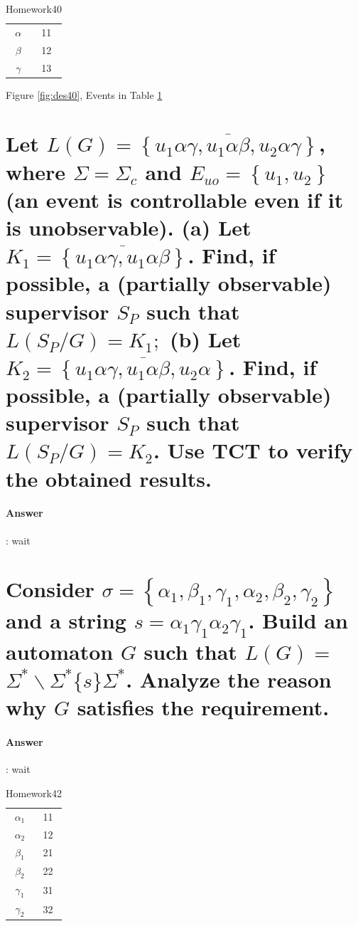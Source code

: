 \documentclass{article}
\begin{document}
\begin{table}
  \centering
  \begin{tabular}{|c|c|}
    $\alpha$ & 11\\
    $\beta$ & 12\\
    $\gamma$ & 13\\
  \end{tabular}
  \caption{Homework40}
  \label{tab:des40}
\end{table}

Figure \ref{fig:des40}, Events in Table \ref{tab:des40}

\section{Let $L(G)=\overline{\left\{u_1 \alpha \gamma, u_1 \alpha \beta, u_2 \alpha \gamma\right\}}$, where $\Sigma=\Sigma_c$ and $E_{u o}=\left\{u_1, u_2\right\}$ (an event is controllable even if it is unobservable). (a) Let $K_1=\overline{\left\{u_1 \alpha \gamma, u_1 \alpha \beta\right\}}$. Find, if possible, a (partially observable) supervisor $S_P$ such that $L\left(S_P / G\right)=K_1 ;$ (b) Let $K_2=\overline{\left\{u_1 \alpha \gamma, u_1 \alpha \beta, u_2 \alpha\right\}}$. Find, if possible, a (partially observable) supervisor $S_P$ such that $L\left(S_P / G\right)=K_2$. Use TCT to verify the obtained results.}

\paragraph{Answer}:
wait

\section{Consider $\sigma=\left\{\alpha_1, \beta_1, \gamma_1, \alpha_2, \beta_2, \gamma_2\right\}$ and a string $s=\alpha_1 \gamma_1 \alpha_2 \gamma_1$. Build an automaton $G$ such that $L(G)=$ $\Sigma^* \backslash \Sigma^*\{s\} \Sigma^*$. Analyze the reason why $G$ satisfies the requirement.}

\paragraph{Answer}:
wait

\begin{table}
  \centering
  \begin{tabular}{|c|c|}
    $\alpha_1$ & 11\\
    $\alpha_2$ & 12\\
    \hline
    $\beta_1$ & 21\\
    $\beta_2$ & 22\\
    \hline
    $\gamma_1$ & 31\\
    $\gamma_2$ & 32\\
  \end{tabular}
  \caption{Homework42}
  \label{tab:des42}
\end{table}
\end{document}

